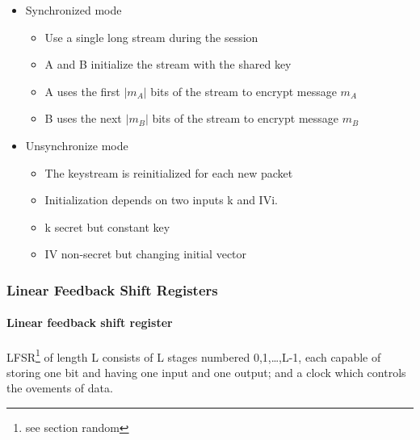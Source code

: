 \begin{itemize}
    \item Synchronized mode
    \begin{itemize}
        \item Use a single long stream during the session
        \item A and B initialize the stream with the shared key
        \item A uses the first $|m_A|$ bits of the stream to encrypt message
        $m_A$
        \item B uses the next $|m_B|$ bits of the stream to encrypt message
        $m_B$
    \end{itemize}

    \item Unsynchronize mode
    \begin{itemize}
        \item The keystream is reinitialized for each new packet
        \item Initialization depends on two inputs k and IVi\@.
        \item k secret but constant key
        \item IV non-secret but changing initial vector
    \end{itemize}
\end{itemize}

\subsubsection{Linear Feedback Shift Registers}
\paragraph{Linear feedback shift register} LFSR\footnote{see section random}
of length L consists of L
stages numbered 0,1,\ldots,L-1, each capable of storing one bit and having one
input and one output; and a clock which controls the ovements of data.

